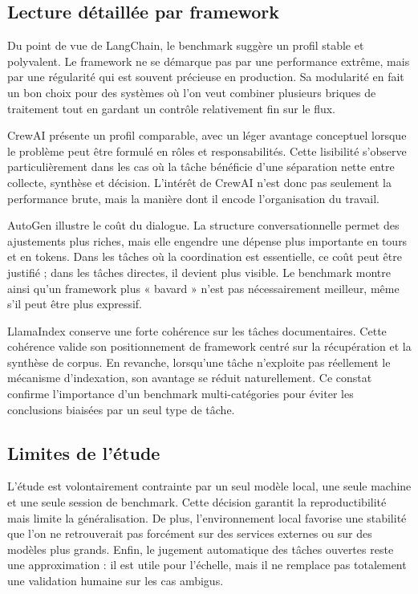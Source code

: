 \documentclass[11pt,a4paper]{article}
\begin{document}
\subsection{Lecture détaillée par framework}
Du point de vue de LangChain, le benchmark suggère un profil stable et polyvalent. Le framework ne se démarque pas par une performance extrême, mais par une régularité qui est souvent précieuse en production. Sa modularité en fait un bon choix pour des systèmes où l'on veut combiner plusieurs briques de traitement tout en gardant un contrôle relativement fin sur le flux.

CrewAI présente un profil comparable, avec un léger avantage conceptuel lorsque le problème peut être formulé en rôles et responsabilités. Cette lisibilité s'observe particulièrement dans les cas où la tâche bénéficie d'une séparation nette entre collecte, synthèse et décision. L'intérêt de CrewAI n'est donc pas seulement la performance brute, mais la manière dont il encode l'organisation du travail.

AutoGen illustre le coût du dialogue. La structure conversationnelle permet des ajustements plus riches, mais elle engendre une dépense plus importante en tours et en tokens. Dans les tâches où la coordination est essentielle, ce coût peut être justifié ; dans les tâches directes, il devient plus visible. Le benchmark montre ainsi qu'un framework plus « bavard » n'est pas nécessairement meilleur, même s'il peut être plus expressif.

LlamaIndex conserve une forte cohérence sur les tâches documentaires. Cette cohérence valide son positionnement de framework centré sur la récupération et la synthèse de corpus. En revanche, lorsqu'une tâche n'exploite pas réellement le mécanisme d'indexation, son avantage se réduit naturellement. Ce constat confirme l'importance d'un benchmark multi-catégories pour éviter les conclusions biaisées par un seul type de tâche.

\subsection{Limites de l'étude}
L'étude est volontairement contrainte par un seul modèle local, une seule machine et une seule session de benchmark. Cette décision garantit la reproductibilité mais limite la généralisation. De plus, l'environnement local favorise une stabilité que l'on ne retrouverait pas forcément sur des services externes ou sur des modèles plus grands. Enfin, le jugement automatique des tâches ouvertes reste une approximation : il est utile pour l'échelle, mais il ne remplace pas totalement une validation humaine sur les cas ambigus.
\end{document}
